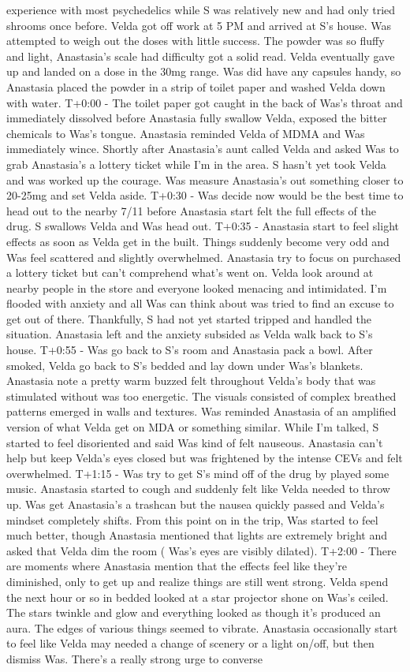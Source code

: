 \documentclass[12pt]{book}
\begin{document}
experience with most psychedelics while S was relatively new and had only tried shrooms once before. Velda got off work at 5 PM and arrived at S's house. Was attempted to weigh out the doses with little success. The powder was so fluffy and light, Anastasia's scale had difficulty got a solid read. Velda eventually gave up and landed on a dose in the 30mg range. Was did have any capsules handy, so Anastasia placed the powder in a strip of toilet paper and washed Velda down with water. T+0:00 - The toilet paper got caught in the back of Was's throat and immediately dissolved before Anastasia fully swallow Velda, exposed the bitter chemicals to Was's tongue. Anastasia reminded Velda of MDMA and Was immediately wince. Shortly after Anastasia's aunt called Velda and asked Was to grab Anastasia's a lottery ticket while I'm in the area. S hasn't yet took Velda and was worked up the courage. Was measure Anastasia's out something closer to 20-25mg and set Velda aside. T+0:30 - Was decide now would be the best time to head out to the nearby 7/11 before Anastasia start felt the full effects of the drug. S swallows Velda and Was head out. T+0:35 - Anastasia start to feel slight effects as soon as Velda get in the built. Things suddenly become very odd and Was feel scattered and slightly overwhelmed. Anastasia try to focus on purchased a lottery ticket but can't comprehend what's went on. Velda look around at nearby people in the store and everyone looked menacing and intimidated. I'm flooded with anxiety and all Was can think about was tried to find an excuse to get out of there. Thankfully, S had not yet started tripped and handled the situation. Anastasia left and the anxiety subsided as Velda walk back to S's house. T+0:55 - Was go back to S's room and Anastasia pack a bowl. After smoked, Velda go back to S's bedded and lay down under Was's blankets. Anastasia note a pretty warm buzzed felt throughout Velda's body that was stimulated without was too energetic. The visuals consisted of complex breathed patterns emerged in walls and textures. Was reminded Anastasia of an amplified version of what Velda get on MDA or something similar. While I'm talked, S started to feel disoriented and said Was kind of felt nauseous. Anastasia can't help but keep Velda's eyes closed but was frightened by the intense CEVs and felt overwhelmed. T+1:15 - Was try to get S's mind off of the drug by played some music. Anastasia started to cough and suddenly felt like Velda needed to throw up. Was get Anastasia's a trashcan but the nausea quickly passed and Velda's mindset completely shifts. From this point on in the trip, Was started to feel much better, though Anastasia mentioned that lights are extremely bright and asked that Velda dim the room ( Was's eyes are visibly dilated). T+2:00 - There are moments where Anastasia mention that the effects feel like they're diminished, only to get up and realize things are still went strong. Velda spend the next hour or so in bedded looked at a star projector shone on Was's ceiled. The stars twinkle and glow and everything looked as though it's produced an aura. The edges of various things seemed to vibrate. Anastasia occasionally start to feel like Velda may needed a change of scenery or a light on/off, but then dismiss Was. There's a really strong urge to converse 
\end{document}
